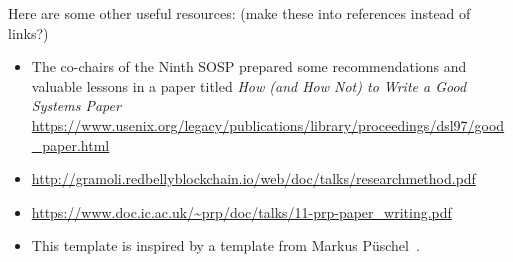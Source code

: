 Here are some other useful resources: (make these into references instead of links?)
\begin{itemize}
\item The co-chairs of the Ninth SOSP prepared some recommendations and valuable lessons in a paper titled \textit{How (and How Not) to Write a Good Systems Paper} \url{https://www.usenix.org/legacy/publications/library/proceedings/dsl97/good_paper.html}
\item \url{http://gramoli.redbellyblockchain.io/web/doc/talks/researchmethod.pdf}
\item \url{https://www.doc.ic.ac.uk/~prp/doc/talks/11-prp-paper_writing.pdf}
\item This template is inspired by a template from Markus P\"uschel~\cite{puschel}.

\end{itemize}